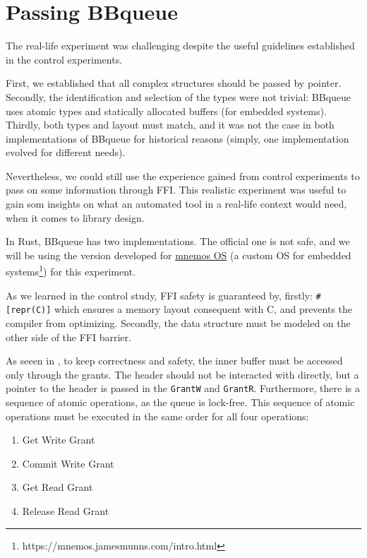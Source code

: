 \documentclass[nomenclature, english, bibtex]{kththesis}
\begin{document}




\section{Passing BBqueue}

The real-life experiment was challenging despite the useful guidelines established in the control experiments.

First, we established that all complex structures should be passed by pointer.
Secondly, the identification and selection of the types were not trivial: BBqueue uses atomic types and statically allocated buffers (for embedded systems).
Thirdly, both types and layout must match, and it was not the case in both implementations of BBqueue for historical reasons (simply, one implementation evolved for different needs).

Nevertheless, we could still use the experience gained from control experiments to pass on some information through FFI. This realistic experiment was useful to gain som insights on what an automated tool in a real-life context would need, when it comes to library design.

In Rust, BBqueue has two implementations. The official one is not  safe, and we will be using the version developed for \href{https://github.com/tosc-rs/mnemos/tree/main/source/abi/src/bbqueue_ipc}{mnemos OS} (a custom OS for embedded systems\footnote{https://mnemos.jamesmunns.com/intro.html}) for this experiment.  

As we learned in the control study,  FFI safety is guaranteed by, firstly:  \texttt{\#[repr(C)]} which ensures a memory layout consequent with C, and prevents the compiler from optimizing. Secondly, the data structure must be modeled on the other side of the FFI barrier.

As seeen in , to keep correctness and safety, the inner buffer must be accessed only through the grants. The header should not be interacted with directly, but a pointer to the header is passed in the  \texttt{GrantW} and \texttt{GrantR}. Furthermore, there is a sequence of atomic operations, as the queue is lock-free. This sequence of atomic operations must be executed in the same order for all four operations:
\begin{enumerate}
    \item Get Write Grant
    \item Commit Write Grant
    \item Get Read Grant
    \item Release Read Grant
\end{enumerate}
   
\end{document}
